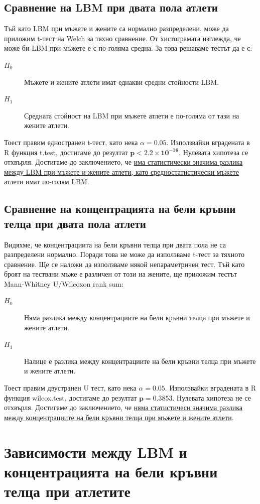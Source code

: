 \documentclass[12pt]{article} %
\begin{document}
\begin{large}
\subsection{Сравнение на LBM при двата пола атлети}

Тъй като LBM при мъжете и жените са нормално разпределени, може да приложим t-тест на Welch за тяхно сравнение. От хистограмата изглежда, че може би LBM при мъжете е с по-голяма средна. За това решаваме тестът да е с:
\begin{description}
\item[$H_0$] Мъжете и жените атлети имат еднакви средни стойности LBM. 
\item[$H_1$] Средната стойност на LBM при мъжете атлети е по-голяма от тази на жените атлети.
\end{description}
Тоест правим едностранен t-тест, като нека $\alpha=0.05$. Използвайки вградената в R функция t.test, достигаме до резултат $\mathbf{p<2.2 \times 10^{-16}}$. Нулевата хипотеза се отхвърля. Достигаме до заключението, че \uline{има статистически значима разлика между LBM при мъжете и жените атлети, като средностатистически мъжете атлети имат по-голям LBM}.

\subsection{Сравнение на концентрацията на бели кръвни телца при двата пола атлети}
Видяхме, че концентрациита на бели кръвни телца при двата пола не 
са разпределени нормално. Поради това не може да използваме t-тест за 
тяхното сравнение. Ще се наложи да използваме някой непараметричен 
тест. Тъй като броят на тествани мъже е различен от този на жените, ще 
приложим тестът Mann-Whitney U/Wilcoxon rank sum:
\begin{description}
\item[$H_0$] Няма разлика между концентрациите на бели кръвни телца при мъжете и жените атлети. 
\item[$H_1$] Налице е разлика между концентрациите на бели кръвни телца при мъжете и жените атлети.
\end{description}
Тоест правим двустранен U тест, като нека $\alpha=0.05$. Използвайки 
вградената в R функция wilcox.test, достигаме до резултат $\mathbf{p=0.3853}$. 
Нулевата хипотеза не се отхвърля. Достигаме до заключението, че \uline{няма статистичеси значима разлика между концентрациите на бели кръвни телца при мъжете и жените атлети}.


\section{Зависимости между LBM и концентрацията на бели кръвни телца при атлетите}


\end{large}
\end{document}
